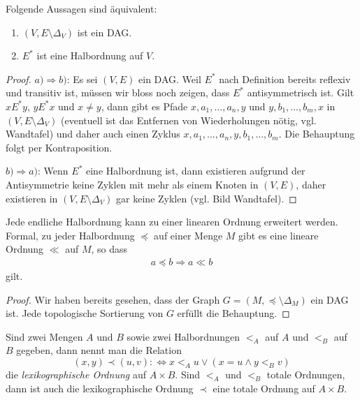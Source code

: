     \begin{satz}
        Folgende Aussagen sind äquivalent:
        \begin{enumerate}
            \item $(V,E\setminus \Delta_V)$ ist ein DAG.
            \item $E^*$ ist eine Halbordnung auf $V$.
        \end{enumerate}
    \end{satz}
    \begin{proof}
        $a)\Rightarrow b)$: Es sei $(V,E)$ ein DAG. Weil $E^*$ nach Definition bereits
        reflexiv und transitiv ist, müssen wir bloss noch zeigen, dass $E^*$
        antisymmetrisch ist. Gilt $xE^*y$, $yE^*x$ und $x\neq y$, dann gibt es
        Pfade $x,a_1,\dots,a_n,y$ und $y,b_1,\dots,b_m,x$ in $(V,E\setminus \Delta_V)$ (eventuell ist das Entfernen von Wiederholungen nötig, vgl. Wandtafel) und daher auch
        einen Zyklus $x,a_1,\dots,a_n,y,b_1,\dots,b_m$. Die Behauptung folgt per
        Kontraposition.

        $b)\Rightarrow a)$: Wenn $E^*$ eine Halbordnung ist, dann existieren aufgrund der
        Antisymmetrie keine Zyklen mit mehr als einem Knoten in $(V,E)$, daher existieren in
        $(V,E\setminus\Delta_V)$ gar keine Zyklen (vgl. Bild Wandtafel).
    \end{proof}

    \begin{cor}
        Jede endliche Halbordnung kann zu einer linearen Ordnung erweitert werden. Formal, zu jeder Halbordnung $\preceq$ auf einer Menge $M$ gibt es eine lineare Ordnung $\ll$ auf $M$, so dass
        \begin{align*}
        a\preceq b \Rightarrow a\ll b
        \end{align*}
        gilt.
    \end{cor}
    \begin{proof}
        Wir haben bereits gesehen, dass der Graph $G=(M,\preceq\setminus\Delta_M)$ ein DAG ist. Jede topologische Sortierung von $G$ erfüllt die Behauptung.
    \end{proof}

    \begin{rk}
    Sind zwei Mengen $A$ und $B$ sowie zwei Halbordnungen $<_A$ auf $A$ und $<_B$ auf $B$ gegeben, dann nennt man die Relation
    \[
    (x,y)\prec (u,v):\Leftrightarrow x<_A u\lor (x=u\land y<_Bv)
    \]
    die \textit{lexikographische Ordnung} auf $A\times B$. Sind $<_A$ und $<_B$ totale Ordnungen, dann ist auch die lexikographische Ordnung $\prec$ eine totale Ordnung auf $A\times B$.
    \end{rk}


